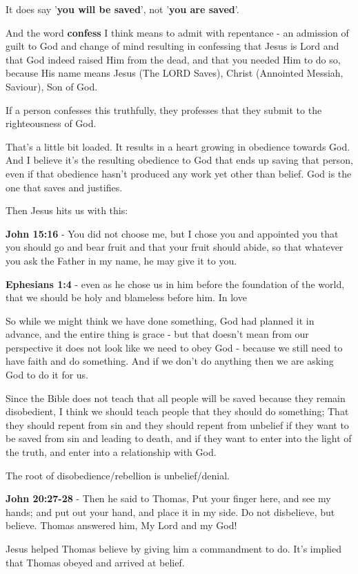 \documentclass[11pt]{article}
\begin{document}
It does say '\textbf{you will be saved}', not '\textbf{you are saved}'.

And the word \textbf{confess} I think means to admit with repentance - an admission of guilt to God and change of mind resulting in confessing that Jesus is Lord and that God indeed raised Him from the dead, and that you needed Him to do so, because His name means Jesus (The LORD Saves), Christ (Annointed Messiah, Saviour), Son of God.

If a person confesses this truthfully, they professes that they submit to the righteousness of God.

That's a little bit loaded. It results in a heart growing in obedience towards God.
And I believe it's the resulting obedience to God that ends up saving that person, even if that obedience hasn't produced any work yet other than belief. God is the one that saves and justifies.

Then Jesus hits us with this:

\textbf{John 15:16} - You did not choose me, but I chose you and appointed you that you should go and bear fruit and that your fruit should abide, so that whatever you ask the Father in my name, he may give it to you.

\textbf{Ephesians 1:4} - even as he chose us in him before the foundation of the world, that we should be holy and blameless before him. In love

So while we might think we have done something, God had planned it in advance, and the entire thing is grace - but that doesn't mean from our perspective it does not look like we need to obey God - because we still need to have faith and do something. And if we don't do anything then we are asking God to do it for us.

Since the Bible does not teach that all people will be saved because they remain disobedient, I think we should teach people that they should do something; That they should repent from sin and they should repent from unbelief if they want to be saved from sin and leading to death, and if they want to enter into the light of the truth, and enter into a relationship with God.

The root of disobedience/rebellion is unbelief/denial.

\textbf{John 20:27-28} - Then he said to Thomas, Put your finger here, and see my hands; and put out your hand, and place it in my side. Do not disbelieve, but believe. Thomas answered him, My Lord and my God!

Jesus helped Thomas believe by giving him a commandment to do. It's implied that Thomas obeyed and arrived at belief.
\end{document}
